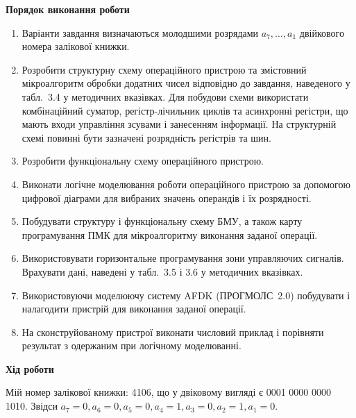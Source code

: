 \documentclass[12pt,a4paper]{article}
\begin{document}
    \begin{center} \textbf{\large Порядок виконання роботи} \end{center}

    \begin{enumerate}

        \item Варіанти завдання визначаються молодшими розрядами $a_7,\ldots,a_1$ двійкового номера залікової книжки.

        \item Розробити структурну схему операційного пристрою та змістовний мікроалгоритм обробки додатних чисел відповідно до завдання, наведеного у табл.~3.4 у методичних вказівках. Для побудови схеми використати комбінаційний суматор, регістр-лічильник циклів та асинхронні регістри, що мають входи управління зсувами і занесенням інформації. На структурній схемі повинні бути зазначені розрядність регістрів та шин.

        \item Розробити функціональну схему операційного пристрою.

        \item Виконати логічне моделювання роботи операційного пристрою за допомогою цифрової діаграми для вибраних значень операндів і їх розрядності.

        \item Побудувати структуру і функціональну схему БМУ, а також карту програмування ПМК для мікроалгоритму виконання заданої операції.

        \item Використовувати горизонтальне програмування зони управляючих сигналів. Врахувати дані, наведені у табл.~3.5 і 3.6 у методичних вказівках.

        \item Використовуючи моделюючу систему AFDK (ПРОГМОЛС~2.0) побудувати і налагодити пристрій для виконання заданої операції.

        \item На сконструйованому пристрої виконати числовий приклад і порівняти результат з одержаним при логічному моделюванні.

    \end{enumerate}

    \begin{center} \textbf{\large Хід роботи} \end{center}

    Мій номер залікової книжки: 4106, що у двіковому вигляді є 0001 0000 0000 1010.
    Звідси $a_7 = 0, a_6 = 0, a_5 = 0, a_4 = 1, a_3 = 0, a_2 = 1, a_1 = 0$.
\end{document}
